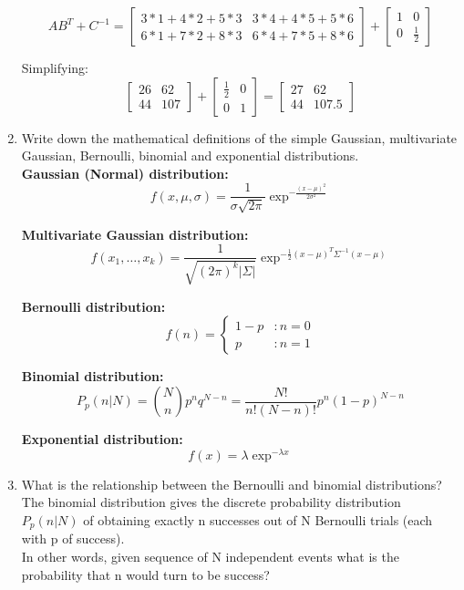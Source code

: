 \documentclass{article}
\begin{document}
\begin{enumerate}
		\[
			AB^T + C^{-1} = 
			\begin{bmatrix}
			3*1 + 4*2 + 5*3 & 3*4 + 4*5 + 5*6 \\
			6*1 + 7*2 + 8*3 & 6*4 + 7*5 + 8*6 
			\end{bmatrix}
			+ \begin{bmatrix}
			1 & 0\\
			0 & \frac{1}{2}
			\end{bmatrix}	
		\]
		
		Simplifying:
		\[			
			\begin{bmatrix}
			26 & 62 \\
			44 & 107 
			\end{bmatrix}
			+ \begin{bmatrix}
			\frac{1}{2} & 0\\
			0 & 1
			\end{bmatrix}
			= \begin{bmatrix}
			27 & 62 \\
			44 & 107.5 
			\end{bmatrix}
		\]
		
		\item Write down the mathematical definitions of the simple Gaussian, multivariate Gaussian, Bernoulli,
		binomial and exponential distributions.\\
		
		\textbf{Gaussian (Normal) distribution:} $$f(x, \mu, \sigma) = \frac{1}{\sigma \sqrt{2\pi}} \exp^{-\frac{(x-\mu)^2}{2\sigma^2}}$$
		
		\textbf{Multivariate Gaussian distribution:} $$f(x_1, \dots , x_k) = \frac{1}{\sqrt{(2\pi)^k |\Sigma|}} \exp^{-\frac{1}{2}(x-\mu)^T \Sigma^{-1} (x - \mu)}$$
		
		\textbf{Bernoulli distribution:} 
		\begin{displaymath}
		f(n) = \left\{
		\begin{array}{lr}
		1 - p & : n = 0\\
		p & : n = 1
		\end{array}
		\right.
		\end{displaymath} 
		
		\textbf{Binomial distribution:} 	
		$$P_p(n|N) = \binom Nn p^nq^{N-n} = \frac{N!}{n!(N-n)!} p^n (1-p)^{N-n}$$

		\textbf{Exponential distribution:} 
		$$f(x) = \lambda \exp^{-\lambda x}$$


		\item What is the relationship between the Bernoulli and binomial distributions?\\
		The binomial distribution gives the discrete probability distribution $P_p(n|N)$ of obtaining exactly n successes out of N Bernoulli trials (each with p of success). \\
		In other words, given sequence of N independent events what is the probability that n would turn to be success? 


\end{enumerate}
\end{document}
